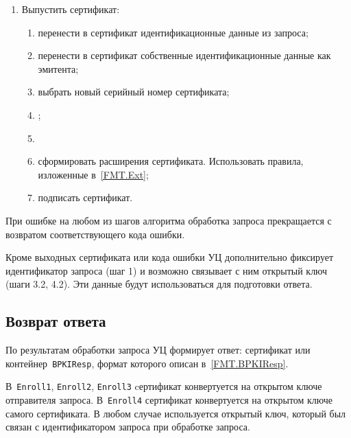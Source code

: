 \begin{enumerate}
\item
Выпустить сертификат:
\begin{enumerate}
\item
перенести в сертификат идентификационные данные из запроса;
\item
перенести в сертификат собственные идентификационные данные как эмитента;
\item
выбрать новый серийный номер сертификата;
\item
{};
\item
{}
\item
сформировать расширения сертификата. Использовать правила,
изложенные в~\ref{FMT.Ext};
\item
подписать сертификат.
\end{enumerate}
\end{enumerate}

При ошибке на любом из шагов алгоритма обработка запроса 
прекращается с возвратом соответствующего кода ошибки.

Кроме выходных сертификата или кода ошибки 
УЦ дополнительно фиксирует идентификатор запроса (шаг 1)
и возможно связывает с ним открытый ключ (шаги 3.2, 4.2). 
Эти данные будут использоваться для подготовки ответа.



\subsection{Возврат ответа}\label{PROCESSES.Enroll.Resp}

По результатам обработки запроса УЦ формирует ответ: сертификат или 
контейнер~\texttt{BPKIResp}, формат которого описан в~\ref{FMT.BPKIResp}. 

В~\texttt{Enroll1}, \texttt{Enroll2}, \texttt{Enroll3}
cертификат конвертуется на открытом ключе отправителя запроса.
В~\texttt{Enroll4} сертификат конвертуется на открытом ключе самого сертификата. 
%
В любом случае используется открытый ключ, который был связан с 
идентификатором запроса при обработке запроса.

